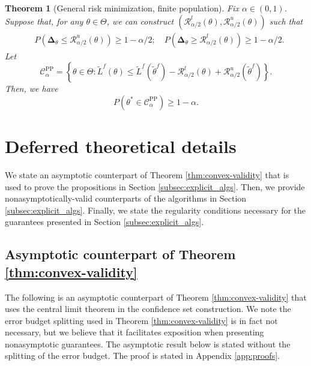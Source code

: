 \documentclass[10pt]{article}
\newtheorem{theorem}{Theorem}
\newcommand{\cR}{\mathcal{R}}
\newcommand{\thetaf}{\tilde{\theta}^{f}}
\newcommand{\rec}{\mathbf{\Delta}}
\newcommand{\CPP}{\mathcal{C}^{\mathrm{PP}}}
\begin{document}
\begin{theorem}[General risk minimization, finite population]
\label{thm:m-estimators-finite-pop}
Fix $\alpha\in(0,1)$. Suppose that, for any $\theta\in\Theta$, we can construct $(\cR_{\alpha/2}^l(\theta), \cR_{\alpha/2}^u(\theta))$ such that 
\begin{align*}
    &P\left(\rec_{\theta} \leq \cR_{\alpha/2}^u(\theta) \right) \geq 1-\alpha/2; \quad P\left(\rec_{\theta} \geq \cR_{\alpha/2}^l(\theta) \right) \geq 1-\alpha/2.
\end{align*}
Let
$$\CPP_\alpha = \left\{\theta\in\Theta : \tilde L^f(\theta) \leq  \tilde L^f(\thetaf) - \cR_{\alpha/2}^l(\theta) + \cR_{\alpha/2}^u(\thetaf)  \right\}.$$
Then, we have
$$P\left( \theta^* \in \CPP_\alpha \right) \geq 1-\alpha.$$
\end{theorem}




\section{Deferred theoretical details}

We state an asymptotic counterpart of Theorem \ref{thm:convex-validity} that is used to prove the propositions in Section \ref{subsec:explicit_algs}. Then, we provide nonasymptotically-valid counterparts of the algorithms in Section \ref{subsec:explicit_algs}. Finally, we state the regularity conditions necessary for the guarantees presented in Section \ref{subsec:explicit_algs}.

\subsection{Asymptotic counterpart of Theorem \ref{thm:convex-validity}}
\label{app:asymp-convex-validity}

The following is an asymptotic counterpart of Theorem \ref{thm:convex-validity} that uses the central limit theorem in the confidence set construction. We note the error budget splitting used in Theorem \ref{thm:convex-validity} is in fact not necessary, but we believe that it facilitates exposition when presenting nonasymptotic guarantees. The asymptotic result below is stated without the splitting of the error budget. The proof is stated in Appendix \ref{app:proofs}.
\end{document}
